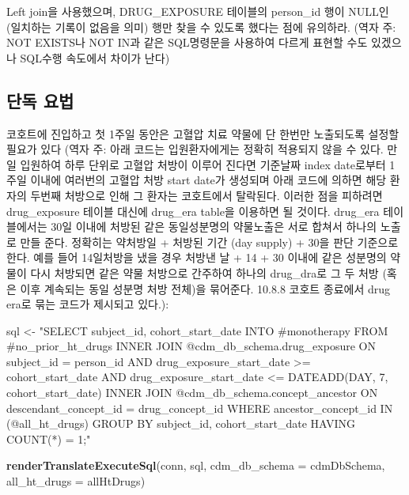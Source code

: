 \documentclass[11pt]{book}
\newenvironment{Shaded}{\begin{snugshade}}{\end{snugshade}}
\newcommand{\KeywordTok}[1]{\textcolor[rgb]{0.13,0.29,0.53}{\textbf{#1}}}
\newcommand{\DataTypeTok}[1]{\textcolor[rgb]{0.13,0.29,0.53}{#1}}
\newcommand{\StringTok}[1]{\textcolor[rgb]{0.31,0.60,0.02}{#1}}
\newcommand{\NormalTok}[1]{#1}
\theoremstyle{definition}
\theoremstyle{definition}
\theoremstyle{definition}
\theoremstyle{remark}
\begin{document}
Left join을 사용했으며, DRUG\_EXPOSURE 테이블의 person\_id 행이 NULL인
(일치하는 기록이 없음을 의미) 행만 찾을 수 있도록 했다는 점에 유의하라.
(역자 주: NOT EXISTS나 NOT IN과 같은 SQL명령문을 사용하여 다르게 표현할
수도 있겠으나 SQL수행 속도에서 차이가 난다)

\subsection{단독 요법}\label{-}

코호트에 진입하고 첫 1주일 동안은 고혈압 치료 약물에 단 한번만
노출되도록 설정할 필요가 있다 (역자 주: 아래 코드는 입원환자에게는
정확히 적용되지 않을 수 있다. 만일 입원하여 하루 단위로 고혈압 처방이
이루어 진다면 기준날짜 index date로부터 1주일 이내에 여러번의 고혈압
처방 start date가 생성되며 아래 코드에 의하면 해당 환자의 두번째
처방으로 인해 그 환자는 코호트에서 탈락된다. 이러한 점을 피하려면
drug\_exposure 테이블 대신에 drug\_era table을 이용하면 될 것이다.
drug\_era 테이블에서는 30일 이내에 처방된 같은 동일성분명의 약물노출은
서로 합쳐서 하나의 노출로 만들 준다. 정확히는 약처방일 + 처방된 기간
(day supply) + 30을 판단 기준으로 한다. 예를 들어 14일처방을 냈을 경우
처방낸 날 + 14 + 30 이내에 같은 성분명의 약물이 다시 처방되면 같은 약물
처방으로 간주하여 하나의 drug\_dra로 그 두 처방 (혹은 이후 계속되는 동일
성분명 처방 전체)을 묶어준다. 10.8.8 코호트 종료에서 drug era로 묶는
코드가 제시되고 있다.):

\begin{Shaded}
\begin{Highlighting}[]
\NormalTok{sql <-}\StringTok{ "SELECT subject_id,}
\StringTok{  cohort_start_date}
\StringTok{INTO #monotherapy}
\StringTok{FROM #no_prior_ht_drugs}
\StringTok{INNER JOIN @cdm_db_schema.drug_exposure}
\StringTok{  ON subject_id = person_id}
\StringTok{    AND drug_exposure_start_date >= cohort_start_date}
\StringTok{    AND drug_exposure_start_date <= DATEADD(DAY, 7, cohort_start_date)}
\StringTok{INNER JOIN @cdm_db_schema.concept_ancestor}
\StringTok{  ON descendant_concept_id = drug_concept_id}
\StringTok{WHERE ancestor_concept_id IN (@all_ht_drugs)}
\StringTok{GROUP BY subject_id,}
\StringTok{  cohort_start_date}
\StringTok{HAVING COUNT(*) = 1;"}

\KeywordTok{renderTranslateExecuteSql}\NormalTok{(conn,}
\NormalTok{                          sql,}
                          \DataTypeTok{cdm_db_schema =}\NormalTok{ cdmDbSchema,}
                          \DataTypeTok{all_ht_drugs =}\NormalTok{ allHtDrugs)}
\end{Highlighting}
\end{Shaded}
\end{document}
